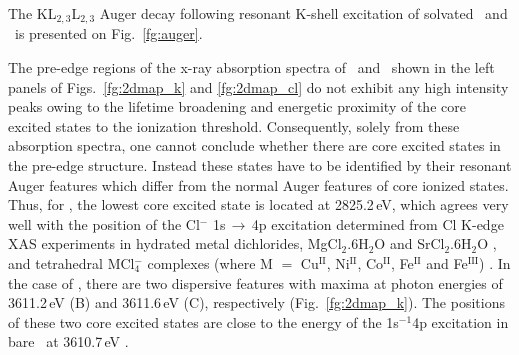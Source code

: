 

The KL$_{2,3}$L$_{2,3}$ Auger decay following resonant K-shell excitation of solvated \ki~and \cli~is presented on Fig.\ \ref{fg:auger}.

The pre-edge regions of the x-ray absorption spectra of \ki~and \cli~shown in the left panels of Figs.\ \ref{fg:2dmap_k} and \ref{fg:2dmap_cl} do not exhibit any high intensity peaks owing to the lifetime broadening and energetic proximity of the core excited states to the ionization threshold. Consequently, solely from these absorption spectra, one cannot conclude whether there are core excited states in the pre-edge structure. Instead these states have to be identified by their resonant Auger features which differ from the normal Auger features of core ionized states. Thus, for \cli, the lowest core excited state is located at 2825.2\,eV, which agrees very well with the position of the Cl$^{-}$ 1s$\,\rightarrow\,$4p excitation determined from Cl K-edge XAS experiments in hydrated metal dichlorides, MgCl$_2$.6H$_2$O and SrCl$_2$.6H$_2$O \citep{sugiura82:681}, and tetrahedral MCl$_{4}^{-}$ complexes (where M $=$ Cu$^{\text{II}}$, Ni$^{\text{II}}$, Co$^{\text{II}}$, Fe$^{\text{II}}$ and Fe$^{\text{III}}$) \citep{shadle95:2259}. In the case of \ki, there are two dispersive features with maxima at photon energies of 3611.2\,eV (B) and 3611.6\,eV (C), respectively (Fig.\ \ref{fg:2dmap_k}). The positions of these two core excited states are close to the energy of the 1s$^{-1}$4p excitation in bare \ki~at 3610.7\,eV \citep{hertlein06:062715}.


